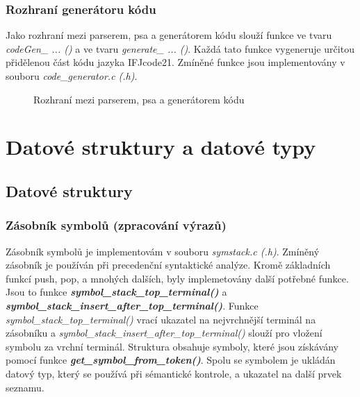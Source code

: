 \documentclass[a4paper, 12pt]{article}
\begin{document}
\subsubsection{Rozhraní generátoru kódu}
Jako rozhraní mezi parserem, psa a generátorem kódu slouží funkce ve tvaru \textit{codeGen\_ ... ()} a ve tvaru \textit{generate\_ ... ()}. Každá tato funkce vygeneruje určitou přidělenou část kódu jazyka IFJcode21. Zmíněné funkce jsou implementovány v souboru \textit{code\_generator.c (.h)}.

\vspace{0.75cm}

\begin{figure}[ht!]
\begin{center}
\caption{Rozhraní mezi parserem, psa a generátorem kódu}
\end{center}
\end{figure}

\newpage

\section{Datové struktury a datové typy}
\subsection{Datové struktury}

\subsubsection{Zásobník symbolů (zpracování výrazů)}
Zásobník symbolů je implementovám v souboru \textit{symstack.c (.h)}. Zmíněný zásobník je používán při precedenční syntaktické analýze. Kromě základních funkcí push, pop, a mnohých dalších, byly implemetovány další potřebné funkce. Jsou to funkce \textit{\textbf{symbol\_stack\_top\_terminal()}} a \textit{\textbf{symbol\_stack\_insert\_after\_top\_terminal()}}. Funkce \textit{symbol\_stack\_top\_terminal()} vrací ukazatel na nejvrchnější terminál na zásobníku a \textit{symbol\_stack\_insert\_after\_top\_terminal()} slouží pro vložení symbolu za vrchní terminál. Struktura obsahuje symboly, které jsou získávány pomocí funkce \textit{\textbf{get\_symbol\_from\_token()}}. Spolu se symbolem je ukládán datový typ, který se používá při sémantické kontrole, a ukazatel na další prvek seznamu.
\end{document}
